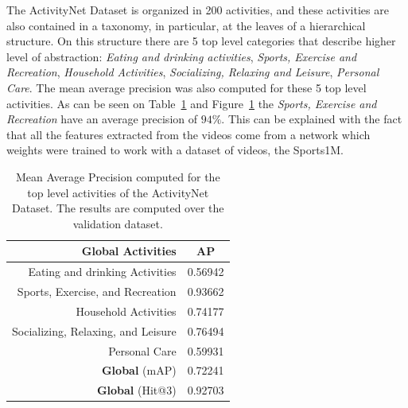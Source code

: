 The ActivityNet Dataset is organized in 200 activities, and these activities are also contained in a taxonomy, in particular, at the leaves of a hierarchical structure.
On this structure there are 5 top level categories that describe higher level of abstraction: \textit{Eating and drinking activities}, \textit{Sports, Exercise and Recreation}, \textit{Household Activities}, \textit{Socializing, Relaxing and Leisure}, \textit{Personal Care}.
The mean average precision was also computed for these 5 top level activities.
As can be seen on Table~\ref{table:top_level_classification_ap} and Figure~\ref{table:top_level_classification_ap} the \textit{Sports, Exercise and Recreation} have an average precision of $94\%$. This can be explained with the fact that all the features extracted from the videos come from a network which weights were trained to work with a dataset of videos, the Sports1M\cite{KarpathyCVPR14}.

\begin{table}[H]
\begin{center}
\begin{tabular}{|r|c|}
\hline
\textbf{Global Activities} & \textbf{AP} \\
\hline\hline
Eating and drinking Activities & 0.56942 \\
Sports, Exercise, and Recreation & 0.93662 \\
Household Activities & 0.74177 \\
Socializing, Relaxing, and Leisure & 0.76494 \\
Personal Care & 0.59931 \\
\hline\hline
\textbf{Global} (mAP) & 0.72241 \\
\textbf{Global} (Hit@3) & 0.92703 \\
\hline
\end{tabular}
\end{center}
\caption{Mean Average Precision computed for the top level activities of the ActivityNet Dataset. The results are computed over the validation dataset.}
\label{table:top_level_classification_ap}
\end{table}

